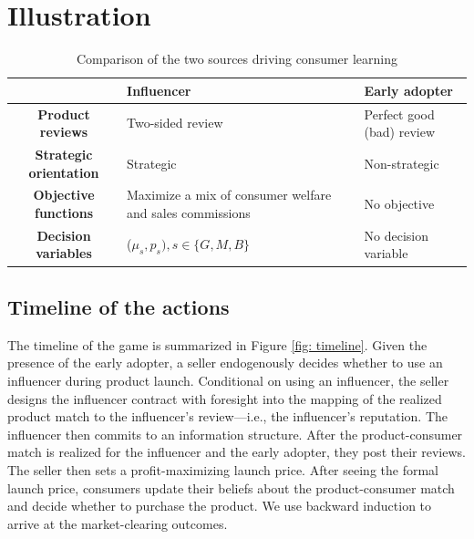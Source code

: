 
\section{Illustration}
    
	\begin{table}[htbp]
		\centering
		\small
		\renewcommand{\arraystretch}{1.2}
		\begin{tabularx}{\textwidth}{|c|Y|Y|}
			\hline
			& \textbf{Influencer} & \textbf{Early adopter} \\
			\hline
			\textbf{Product reviews} & Two-sided review &  Perfect good (bad) review \\
			\hline
			\textbf{Strategic orientation} &  Strategic& Non-strategic \\
			\hline
			\textbf{Objective functions} 
			& Maximize a mix of consumer welfare and sales commissions
			& No objective \\
			\hline
			\textbf{Decision variables} 
			& ($\mu_s, p_s), s\in \{G,M,B\}$ 
			& No decision variable\\
			\hline
		\end{tabularx}
		\caption{Comparison of the two sources driving consumer learning}
		\label{tab:organic_influencer_influencer_lead_user}
	\end{table}
	
	
	
	
	
	\subsection{Timeline of the actions}\label{sec: timeline}
	The timeline of the game is summarized in Figure \ref{fig: timeline}. Given the presence of the early adopter, a seller endogenously decides whether to use an influencer during product launch. Conditional on using an influencer, the seller designs the influencer contract with foresight into the mapping of the realized product match to the influencer's review---i.e., the influencer's reputation. The influencer then commits to an information structure. 
   After the product-consumer match is realized for the influencer and the early adopter,  they post their reviews. The seller then sets a profit-maximizing launch price. After seeing the formal launch price, consumers update their beliefs about the product-consumer match and decide whether to purchase the product. We use backward induction to arrive at the market-clearing outcomes. 




